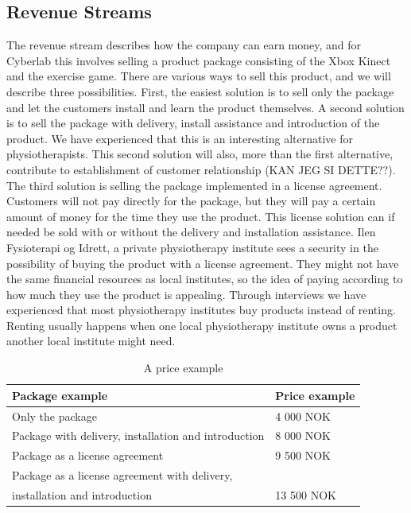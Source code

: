 \subsection{Revenue Streams}
The revenue stream describes how the company can earn money, and for Cyberlab this involves selling a product package consisting of the Xbox Kinect and the exercise game. There are various ways to sell this product, and we will describe three possibilities. First, the easiest solution is to sell only the package and let the customers install and learn the product themselves. A second solution is to sell the package with delivery, install assistance and introduction of the product. We have experienced that this is an interesting alternative for physiotherapists. This second solution will also, more than the first alternative, contribute to establishment of customer relationship (KAN JEG SI DETTE??). The third solution is selling the package implemented in a license agreement. Customers will not pay directly for the package, but they will pay a certain amount of money for the time they use the product. This license solution can if needed be sold with or without the delivery and installation assistance. Ilen Fysioterapi og Idrett, a private physiotherapy institute sees a security in the possibility of buying the product with a license agreement. They might not have the same financial resources as local institutes, so the idea of paying according to how much they use the product is appealing. Through interviews we have experienced that most physiotherapy institutes buy products instead of renting. Renting usually happens when one local physiotherapy institute owns a product another local institute might need.
\begin{table}
\centering
    \begin{tabular}{|l|l|}
        \hline
       \textbf{Package example} & \textbf{Price example}  \\ \hline
       Only the package & 4 000 NOK \\ \hline
	   Package with delivery, installation and introduction & 8 000 NOK \\ \hline
	   Package as a license agreement & 9 500 NOK\\ \hline
	   Package as a license agreement with delivery, \\ 
	   installation and introduction & 13 500 NOK \\
        \hline
    \end{tabular}
    \caption[Priceexample]{A price example}
    \label{tab:Priceexample}
\end{table} 

